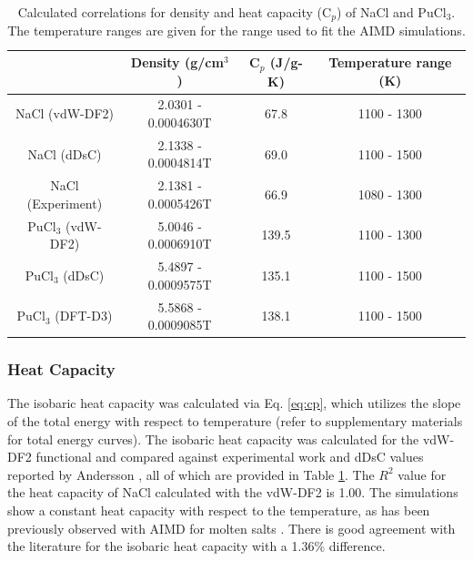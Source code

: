 \documentclass[review]{elsarticle}
\begin{document}
\begin{table}[h!]
\caption{Calculated correlations for density and heat capacity (C$_p$) of NaCl and PuCl$_3$. The temperature ranges are given for the range used to fit the AIMD simulations.}
\centering
\begin{tabular}{|c|c|c|c|}
\hline
                      & Density (g/cm$^{3}$) & C$_p$ (J/g-K)   & Temperature range (K)     \\
\hline
NaCl (vdW-DF2)        &  2.0301 - 0.0004630T             & 67.8 &  1100 - 1300  \\
NaCl (dDsC) \cite{ANDERSSON2022153836}        &  2.1338 - 0.0004814T                     & 69.0 &  1100  - 1500  \\
NaCl (Experiment)      & 2.1381 - 0.0005426T  \cite{janz1988thermodynamic}         &66.9 \cite{nist_ref}    & 1080 - 1300 \cite{janz1988thermodynamic} \\
PuCl$_{3}$ (vdW-DF2) &   5.0046 - 0.0006910T                   & 139.5 &    1100 - 1300 \\
PuCl$_{3}$ (dDsC)    &   5.4897 - 0.0009575T                   & 135.1 &    1100 - 1500   \\
PuCl$_3$ (DFT-D3)       &    5.5868 - 0.0009085T                  & 138.1 &   1100 - 1500 \\
\hline 
\end{tabular}
\label{table:rho_cp_correlation}
\end{table}

\subsubsection{Heat Capacity}
The isobaric heat capacity was calculated via Eq. \ref{eq:cp}, which utilizes the slope of the total energy with respect to temperature (refer to supplementary materials for total energy curves). The isobaric heat capacity was calculated for the vdW-DF2 functional and compared against experimental work \cite{nist_ref} and dDsC values reported by Andersson \cite{ANDERSSON2022153836}, all of which are provided in Table \ref{table:rho_cp_correlation}. The $R^2$ value for the heat capacity of NaCl calculated with the vdW-DF2 is 1.00. The simulations show a constant heat capacity with respect to the temperature, as has been previously observed with AIMD for molten salts \cite{duemmler_naclmgcl, karlsson2022synthesis, yuan2019specific, redkin2015heat}. There is good agreement with the literature for the isobaric heat capacity with a 1.36\% difference. 
\end{document}
